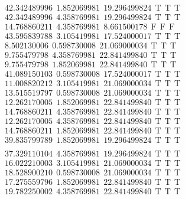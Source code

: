 \documentclass[10pt,a4paper]{article}
\begin{document}
\begin{itemize}
\begin{displaymath}
{\begin{aligned}
&42.342489996 ~~   1.852069981 ~~  19.296499824  ~~\mathrm{T  ~~ T  ~~ T } \\ 
&42.342489996 ~~   4.358769981 ~~  19.296499824  ~~\mathrm{T  ~~ T  ~~ T } \\ 
&14.768860211 ~~   4.358769981 ~~   8.661500178  ~~\mathrm{F  ~~ F  ~~  F} \\ 
&43.595839788 ~~   3.105419981 ~~  17.524000017  ~~\mathrm{T  ~~ T  ~~ T } \\ 
& 8.502130006 ~~   0.598730008 ~~  21.069000034  ~~\mathrm{T  ~~ T  ~~ T } \\ 
& 9.755479798 ~~   4.358769981 ~~  22.841499840  ~~\mathrm{T  ~~ T  ~~ T } \\ 
& 9.755479798 ~~   1.852069981 ~~  22.841499840  ~~\mathrm{T  ~~ T  ~~ T } \\ 
&41.089150103 ~~   0.598730008 ~~  17.524000017  ~~\mathrm{T  ~~ T  ~~ T } \\ 
&11.008820212 ~~   3.105419981 ~~  21.069000034  ~~\mathrm{T  ~~ T  ~~ T } \\ 
&13.515519797 ~~   0.598730008 ~~  21.069000034  ~~\mathrm{T  ~~ T  ~~ T } \\ 
&12.262170005 ~~   1.852069981 ~~  22.841499840  ~~\mathrm{T  ~~ T  ~~ T } \\ 
&14.768860211 ~~   4.358769981 ~~  22.841499840  ~~\mathrm{T  ~~ T  ~~ T } \\ 
&12.262170005 ~~   4.358769981 ~~  22.841499840  ~~\mathrm{T  ~~ T  ~~ T } \\ 
&14.768860211 ~~   1.852069981 ~~  22.841499840  ~~\mathrm{T  ~~ T  ~~ T } \\ 
&39.835799789 ~~   1.852069981 ~~  19.296499824  ~~\mathrm{T  ~~ T  ~~ T } \\ 
				\end{aligned}
			}
		\end{displaymath}
		\begin{displaymath}
			\boxed{
				\begin{aligned}
&37.329110104 ~~   4.358769981 ~~  19.296499824  ~~\mathrm{T  ~~ T  ~~ T } \\ 
&16.022210003 ~~   3.105419981 ~~  21.069000034  ~~\mathrm{T  ~~ T  ~~ T } \\ 
&18.528900210 ~~   0.598730008 ~~  21.069000034  ~~\mathrm{T  ~~ T  ~~ T } \\ 
&17.275559796 ~~   1.852069981 ~~  22.841499840  ~~\mathrm{T  ~~ T  ~~ T } \\ 
&19.782250002 ~~   4.358769981 ~~  22.841499840  ~~\mathrm{T  ~~ T  ~~ T } \\ 

\end{aligned}}
\end{displaymath}
\end{itemize}
\end{document}
